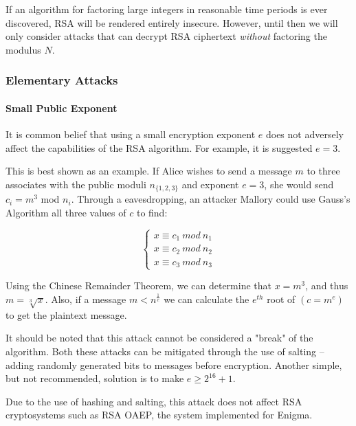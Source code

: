       If an algorithm for factoring large integers in reasonable time periods is ever discovered, RSA will be rendered entirely insecure. However, until then we will only consider attacks that can decrypt RSA ciphertext \emph{without} factoring the modulus $N$.
    
    \subsubsection{Elementary Attacks}
    
      \paragraph{Small Public Exponent}

          It is common belief that using a small encryption exponent $e$ does not adversely affect the capabilities of the RSA algorithm. For example, it is suggested $e=3$.
          
          This is best shown as an example. If Alice wishes to send a message $m$ to three associates with the public moduli $n_{\{1,2,3\}}$ and exponent $e=3$, she would send $c_i = m^3$ mod $n_i$. Through a eavesdropping, an attacker Mallory could use Gauss's Algorithm all three values of $c$ to find:
          
          \[
          	\left\{
          	\begin{array}{ll}
                    x \equiv c_1 \  mod \  n_1 \\
                    x \equiv c_2 \  mod \  n_2\\
                    x \equiv c_3 \  mod \  n_3
                  \end{array}
                  \right.
          \]
          
          Using the Chinese Remainder Theorem, we can determine that $x = m^3$, and thus $m = \sqrt[3]{x}$. Also, if a message $m < n^{\frac{1}{e}}$ we can calculate the $e^{th}$ root of $(c=m^e)$ to get the plaintext message.
          
          It should be noted that this attack cannot be considered a "break" of the algorithm. Both these attacks can be mitigated through the use of salting -- adding randomly generated bits to messages before encryption. Another simple, but not recommended, solution is to make $e \geq 2^{16}+1$.
          
          Due to the use of hashing and salting, this attack does not affect RSA cryptosystems such as RSA OAEP, the system implemented for Enigma.
	
